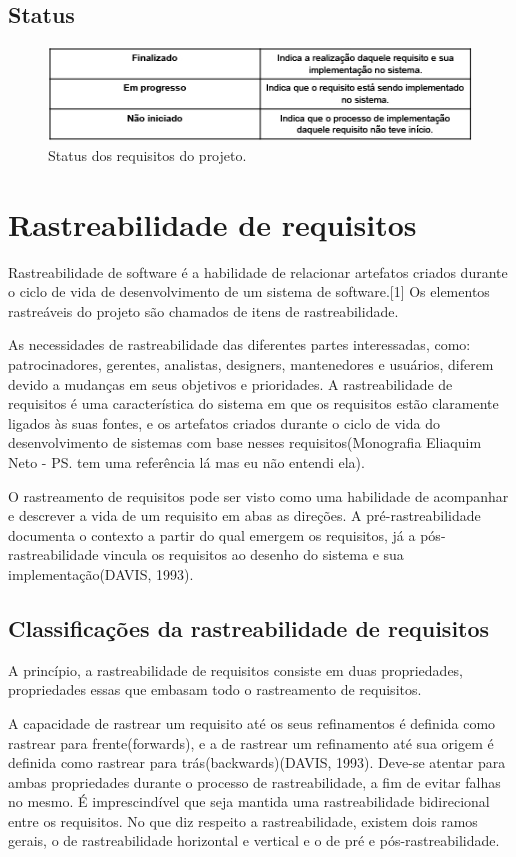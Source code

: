 \subsection{Status}
  \begin{figure}[!htbp]
    \centering
    \includegraphics[scale=0.5]{figuras/tabela_status}
    \caption[Status dos requisitos do projeto.]{Status dos requisitos do projeto. \footnotemark}
    \label{tabela_status}
  \end{figure}
\section{Rastreabilidade de requisitos}
Rastreabilidade de software é a habilidade de relacionar artefatos criados durante o ciclo de vida de desenvolvimento de um sistema de software.[1] Os elementos rastreáveis do projeto são chamados de itens de rastreabilidade.

As necessidades de rastreabilidade das diferentes partes interessadas, como: patrocinadores, gerentes, analistas, designers, mantenedores e usuários, diferem devido a mudanças em seus objetivos e prioridades. A rastreabilidade de requisitos é uma característica do sistema em que os requisitos estão claramente ligados às suas fontes, e os artefatos criados durante o ciclo de vida do desenvolvimento de sistemas com base nesses requisitos(Monografia Eliaquim Neto - PS. tem uma referência lá mas eu não entendi ela).

O rastreamento de requisitos pode ser visto como uma habilidade de acompanhar e descrever a vida de um requisito em abas as direções. A pré-rastreabilidade documenta o contexto a partir do qual emergem os requisitos, já a pós-rastreabilidade vincula os requisitos ao desenho do sistema e sua implementação(DAVIS, 1993).
\subsection{Classificações da rastreabilidade de requisitos}
A princípio, a rastreabilidade de requisitos consiste em duas propriedades, propriedades essas que embasam todo o rastreamento de requisitos.

A capacidade de rastrear um requisito até os seus refinamentos é definida como rastrear para frente(forwards), e a de rastrear um refinamento até sua origem é definida como rastrear para trás(backwards)(DAVIS, 1993). Deve-se atentar para ambas propriedades durante o processo de rastreabilidade, a fim de evitar falhas no mesmo. É imprescindível que seja mantida uma rastreabilidade bidirecional entre os requisitos.
No que diz respeito a rastreabilidade, existem dois ramos gerais, o de rastreabilidade horizontal e vertical e o de pré e pós-rastreabilidade.

